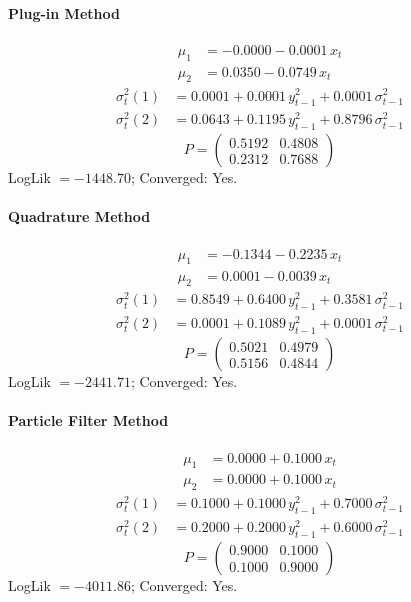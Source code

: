\documentclass[11pt, a4paper]{article}
\begin{document}
\paragraph{Plug-in Method}
\begin{align}
\mu_{1} &= -0.0000 -0.0001\, x_t \\
\mu_{2} &= 0.0350 -0.0749\, x_t
\end{align}
\begin{align}
\sigma^2_{t}(1) &= 0.0001 + 0.0001\, y_{t-1}^2 + 0.0001\, \sigma^2_{t-1} \\
\sigma^2_{t}(2) &= 0.0643 + 0.1195\, y_{t-1}^2 + 0.8796\, \sigma^2_{t-1}
\end{align}
\begin{equation}
P = \begin{pmatrix} 0.5192 & 0.4808 \\ 0.2312 & 0.7688 \end{pmatrix}
\end{equation}
LogLik $= -1448.70$; Converged: Yes.

\paragraph{Quadrature Method}
\begin{align}
\mu_{1} &= -0.1344 -0.2235\, x_t \\
\mu_{2} &= 0.0001 -0.0039\, x_t
\end{align}
\begin{align}
\sigma^2_{t}(1) &= 0.8549 + 0.6400\, y_{t-1}^2 + 0.3581\, \sigma^2_{t-1} \\
\sigma^2_{t}(2) &= 0.0001 + 0.1089\, y_{t-1}^2 + 0.0001\, \sigma^2_{t-1}
\end{align}
\begin{equation}
P = \begin{pmatrix} 0.5021 & 0.4979 \\ 0.5156 & 0.4844 \end{pmatrix}
\end{equation}
LogLik $= -2441.71$; Converged: Yes.

\paragraph{Particle Filter Method}
\begin{align}
\mu_{1} &= 0.0000 + 0.1000\, x_t \\
\mu_{2} &= 0.0000 + 0.1000\, x_t
\end{align}
\begin{align}
\sigma^2_{t}(1) &= 0.1000 + 0.1000\, y_{t-1}^2 + 0.7000\, \sigma^2_{t-1} \\
\sigma^2_{t}(2) &= 0.2000 + 0.2000\, y_{t-1}^2 + 0.6000\, \sigma^2_{t-1}
\end{align}
\begin{equation}
P = \begin{pmatrix} 0.9000 & 0.1000 \\ 0.1000 & 0.9000 \end{pmatrix}
\end{equation}
LogLik $= -4011.86$; Converged: Yes.
\end{document}
